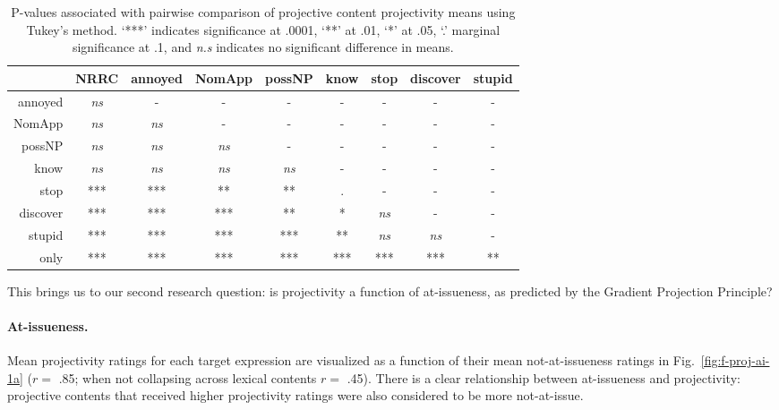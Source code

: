 \documentclass[11pt,fleqn]{article}
\newcommand{\6}{\mbox{$[\hspace*{-.6mm}[$}}
\newcommand{\9}{\mbox{$]\hspace*{-.6mm}]$}}
\newcommand{\figref}[1]{Fig.~\ref{#1}}
\begin{document}
\begin{table}[!h]
\begin{center}
\begin{tabular}{r c c c c c c c c}
\toprule
 &   NRRC & annoyed & NomApp &  possNP &  know & stop & discover & stupid \\
 \midrule
annoyed &  \emph{ns}  &  -  &        -   &       -  &        -  &   - &     -   &  -\\     
NomApp  &  \emph{ns} & \emph{ns} & -    &   -   &    -    &   -  &     -   & - \\    
possNP  &    \emph{ns} & \emph{ns} & \emph{ns} & - &      -  &     -     &  -   & - \\    
know     &   \emph{ns} & \emph{ns} & \emph{ns} & \emph{ns} & -   &    -   &    -       & -\\
stop     &   *** & *** & ** & ** & . & - &  - & -\\      
discover  &   *** & *** & *** & ** & * & \emph{ns} & - & -      \\
stupid    &  *** & *** & *** & *** & ** & \emph{ns} & \emph{ns} & - \\
only      &  *** & *** & *** & *** & *** & *** & *** & ** \\
\bottomrule
\end{tabular}
\caption{P-values associated with pairwise comparison of projective content projectivity means using Tukey's method. `***' indicates significance at .0001, `**' at .01, `*' at .05, `.' marginal significance at .1, and \emph{n.s} indicates no significant difference in means.}\label{tab:pairwise}
\end{center}
\end{table}

This brings us to our second research question: is projectivity a function of at-issueness, as predicted by the Gradient Projection Principle?

\paragraph{At-issueness.} Mean projectivity ratings for each target expression are visualized as a function of their mean not-at-issueness ratings in \figref{fig:f-proj-ai-1a} ($r =$ .85; when not collapsing across lexical contents $r =$ .45). There is a clear relationship between at-issueness and projectivity: projective contents that received higher projectivity ratings were also considered to be more not-at-issue.
\end{document}
